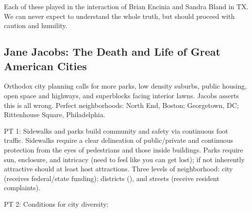 \documentclass[
]{article}
\begin{document}
Each of these played in the interaction of Brian Encinia and Sandra
Bland in TX. We can never expect to understand the whole truth, but
should proceed with caution and humility.

\hypertarget{jane-jacobs-the-death-and-life-of-great-american-cities}{%
\subsection{Jane Jacobs: The Death and Life of Great American
Cities}\label{jane-jacobs-the-death-and-life-of-great-american-cities}}

Orthodox city planning calls for more parks, low density suburbs, public
housing, open space and highways, and superblocks facing interior lawns.
Jacobs asserts this is all wrong. Perfect neighborhoods: North End,
Boston; Georgetown, DC; Rittenhouse Square, Philadelphia.

PT 1: Sidewalks and parks build community and safety via continuous foot
traffic. Sidewalks require a clear delineation of public/private and
continuous protection from the eyes of pedestrians and those inside
buildings. Parks require sun, enclosure, and intricacy (need to feel
like you can get lost); if not inherently attractive should at least
host attractions. Three levels of neighborhood: city (receives
federal/state funding); districts (), and streets (receive resident
complaints).

PT 2: Conditions for city diversity:
\end{document}
